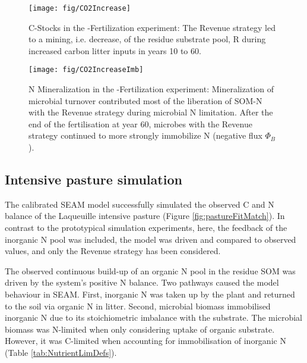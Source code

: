 \begin{figure}[t] \vspace*{2mm}
\begin{center}
\texttt{[image: fig/CO2Increase]}
\end{center}
\caption{
C-Stocks in the -Fertilization experiment: The Revenue strategy led
to a mining, i.e. decrease, of the residue substrate pool, R during increased carbon
litter inputs in years 10 to 60.
\label{fig:CO2Increase}}

\end{figure}
\begin{figure}[t] \vspace*{2mm}
\begin{center}
\texttt{[image: fig/CO2IncreaseImb]} 
\end{center}
\caption{
N Mineralization in the -Fertilization experiment:
Mineralization of microbial turnover contributed most of the liberation of SOM-N
with the Revenue strategy during microbial N limitation.
After the end of the fertilisation at year 60, microbes with the Revenue
strategy continued to more strongly immobilize N (negative flux $\Phi_B$).
\label{fig:CO2IncreaseImb}}
\end{figure}

\subsection{Intensive pasture simulation}
\label{sec:ResultsPasture}

The calibrated SEAM model successfully simulated the observed C and N balance of
the Laqueuille intensive pasture (Figure \ref{fig:pastureFitMatch}). In contrast
to the prototypical simulation experiments, here, the feedback of the inorganic
N pool was included, the model was driven and compared to observed values, and
only the Revenue strategy has been considered.

The observed continuous build-up of an organic N pool in the residue SOM was
driven by the system's positive N balance. Two pathways caused the model
behaviour in SEAM. First, inorganic N was taken up by the plant and returned to
the soil via organic N in litter. Second, microbial biomass immobilised
inorganic N due to its stoichiometric imbalance with the substrate. The
microbial biomass was N-limited when only considering uptake of
organic substrate. However, it was C-limited when accounting for immobilisation
of inorganic N (Table \ref{tab:NutrientLimDefs}). 

